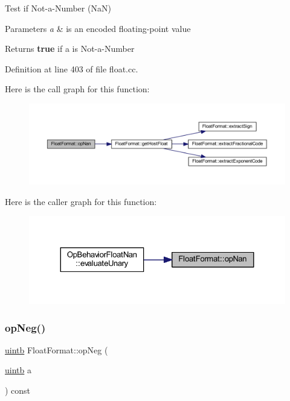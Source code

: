 Test if Not-\/a-\/\+Number (NaN) 


\begin{DoxyParams}{Parameters}
{\em a} & is an encoded floating-\/point value \\
\hline
\end{DoxyParams}
\begin{DoxyReturn}{Returns}
{\bfseries{true}} if a is Not-\/a-\/\+Number 
\end{DoxyReturn}


Definition at line 403 of file float.\+cc.

Here is the call graph for this function\+:
\nopagebreak
\begin{figure}[H]
\begin{center}
\leavevmode
\includegraphics[width=350pt]{class_float_format_a64576b3f398b049f002a6c95e45f2296_cgraph}
\end{center}
\end{figure}
Here is the caller graph for this function\+:
\nopagebreak
\begin{figure}[H]
\begin{center}
\leavevmode
\includegraphics[width=324pt]{class_float_format_a64576b3f398b049f002a6c95e45f2296_icgraph}
\end{center}
\end{figure}
\mbox{\label{class_float_format_af639368d2760482533e8ebf5ee18995b}} 
\subsubsection{\texorpdfstring{opNeg()}{opNeg()}}
{\footnotesize\ttfamily \mbox{\hyperlink{types_8h_a2db313c5d32a12b01d26ac9b3bca178f}{uintb}} Float\+Format\+::op\+Neg (\begin{DoxyParamCaption}\item[{\mbox{\hyperlink{types_8h_a2db313c5d32a12b01d26ac9b3bca178f}{uintb}}}]{a }\end{DoxyParamCaption}) const}



